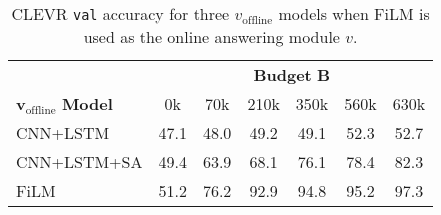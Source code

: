 \documentclass[10pt,twocolumn,letterpaper]{article}
\newcommand{\voffline}{v_{\mathrm{offline}}}
\newcommand{\clevrval}{\texttt{val}\xspace}
\begin{document}
\begin{table}[!t]
\setlength{\tabcolsep}{0.25em}
\centering
\footnotesize{
    \begin{tabular}{@{}l|cccccc@{}}
     & \multicolumn{6}{c}{\textbf{Budget} $\bm{B}$} \\
    $\bm{\voffline}$ \textbf{Model} & 0k & 70k & 210k & 350k & 560k & 630k \\
    \shline
    CNN+LSTM & 47.1 & 48.0 & 49.2 & 49.1 & 52.3 & 52.7 \\
    CNN+LSTM+SA & 49.4 & 63.9 & 68.1 & 76.1 & 78.4 & 82.3 \\
    FiLM & 51.2 & 76.2 & 92.9 & 94.8 & 95.2 & 97.3
    \end{tabular}
\caption{CLEVR \clevrval accuracy for three $\voffline$ models when FiLM is used as the online answering module $v$.}
\label{tab:film_vonline}
\vspace{-1em}
}
\end{table}
\end{document}
